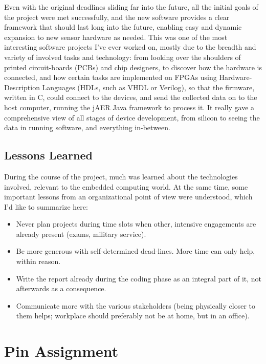 \documentclass[a4paper,12pt]{report}
\begin{document}
Even with the original deadlines sliding far into the future, all the initial goals of the project were met successfully, and the new software provides a clear framework that should last long into the future, enabling easy and dynamic expansion to new sensor hardware as needed.
This was one of the most interesting software projects I've ever worked on, mostly due to the breadth and variety of involved tasks and technology: from looking over the shoulders of printed circuit-boards (PCBs) and chip designers, to discover how the hardware is connected, and how certain tasks are implemented on FPGAs using Hardware-Description Languages (HDLs, such as VHDL or Verilog), so that the firmware, written in C, could connect to the devices, and send the collected data on to the host computer, running the jAER Java framework to process it. It really gave a comprehensive view of all stages of device development, from silicon to seeing the data in running software, and everything in-between.

\section{Lessons Learned} \label{sec:lessons_learned}

During the course of the project, much was learned about the technologies involved, relevant to the embedded computing world.
At the same time, some important lessons from an organizational point of view were understood, which I'd like to summarize here:

\begin{itemize}
\item Never plan projects during time slots when other, intensive engagements are already present (exams, military service).
\item Be more generous with self-determined dead-lines. More time can only help, within reason.
\item Write the report already during the coding phase as an integral part of it, not afterwards as a consequence.
\item Communicate more with the various stakeholders (being physically closer to them helps; workplace should preferably not be at home, but in an office).
\end{itemize}

\appendix
\chapter{Pin Assignment} \label{chap:appendix_pin_assignment}
\end{document}
